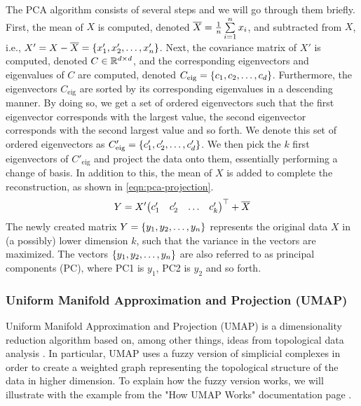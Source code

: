 The PCA algorithm consists of several steps and we will go through them briefly. First, the mean of $X$ is computed, denoted $\overline{X} = \frac{1}{n} \sum\limits_{i=1}^{n} x_i$, and subtracted from $X$, i.e., $X' = X - \overline{X} = \left\{x'_1, x'_2, \ldots, x'_n\right\}$. Next, the covariance matrix of $X'$ is computed, denoted $C \in \mathbb{R}^{d \times d}$, and the corresponding eigenvectors and eigenvalues of $C$ are computed, denoted $C_\text{eig} = \left\{c_1, c_2, \ldots, c_d\right\}$. Furthermore, the eigenvectors $C_\text{eig}$ are sorted by its corresponding eigenvalues in a descending manner. By doing so, we get a set of ordered eigenvectors such that the first eigenvector corresponds with the largest value, the second eigenvector corresponds with the second largest value and so forth. We denote this set of ordered eigenvectors as $C'_\text{eig} = \left\{c'_1, c'_2, \ldots, c'_d\right\}$. We then pick the $k$ first eigenvectors of $C'_\text{eig}$ and project the data onto them, essentially performing a change of basis. In addition to this, the mean of $X$ is added to complete the reconstruction, as shown in \cref{eqn:pca-projection}.
\begin{align}
    \label{eqn:pca-projection}
    Y = X' {\begin{pmatrix}
    c'_1 & c'_2 & \ldots & c'_k
    \end{pmatrix}}^\top + \overline{X}
\end{align}
The newly created matrix $Y = \left\{y_1, y_2, \ldots, y_n\right\}$ represents the original data $X$ in (a possibly) lower dimension $k$, such that the variance in the vectors are maximized. The vectors $\left\{y_1, y_2, \ldots, y_n\right\}$ are also referred to as principal components (PC), where PC1 is $y_1$, PC2 is $y_2$ and so forth.

\subsubsection{Uniform Manifold Approximation and Projection (UMAP)}
\label{sec:umap}
Uniform Manifold Approximation and Projection (UMAP) is a dimensionality reduction algorithm based on, among other things, ideas from topological data analysis \cite{2018arXivUMAP}. In particular, UMAP uses a fuzzy version of simplicial complexes in order to create a weighted graph representing the topological structure of the data in higher dimension. To explain how the fuzzy version works, we will illustrate with the example from the "How UMAP Works" documentation page \cite{how-umap-works-2018}.

